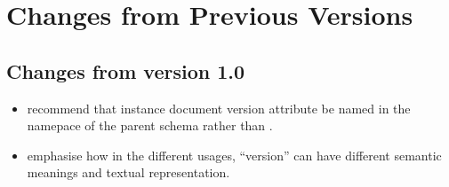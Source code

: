 \documentclass[10pt,a4paper]{ivoa}
\begin{document}
\appendix


\section{Changes from Previous Versions}

\subsection{Changes from version 1.0}
\begin{itemize}
  \item recommend that instance document version attribute be named 
   in the namepace of the parent schema rather than
  .
  \item emphasise how in the different usages, ``version'' can have different
  semantic meanings and textual representation.
\end{itemize}


\end{document}
